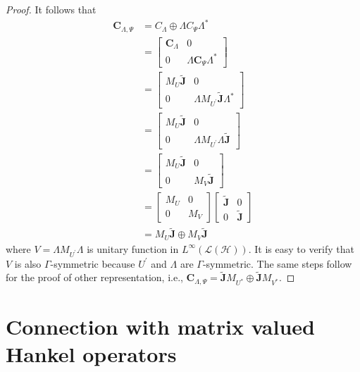 \documentclass[12pt]{amsart}
\numberwithin{equation}{section}
\newcommand{\hsp}{\mathcal{H}}
\newcommand{\oL }{\mathcal{L}(\hsp) }
\newcommand{\C}{{\mathbf{C}}}
\newcommand{\J}{{\mathbf{J}}}
\theoremstyle{definition}
\numberwithin{equation}{section}
\begin{document}
\begin{proof}
It follows that
\begin{align*}
\C_{\Lambda,\Psi}
&=C_{\Lambda}\oplus \Lambda C_{\Psi}\Lambda^{*}\\
&=\begin{bmatrix}
\C_{\Lambda}&0\\
0&\Lambda \C_{\Psi}\Lambda^{*}
\end{bmatrix}\\
&=\begin{bmatrix}
M_{U}\widetilde{\J}&0\\
0&\Lambda M_{U^{\prime}}\widetilde{\J}\Lambda^{*}
\end{bmatrix}\\
&=\begin{bmatrix}
M_{U}\widetilde{\J}&0\\
0&\Lambda M_{U^{\prime}}\Lambda\widetilde{\J}
\end{bmatrix}\\
&=\begin{bmatrix}
M_{U}\widetilde{\J}&0\\
0&M_{V}\widetilde{\J}
\end{bmatrix}\\
&=\begin{bmatrix}
M_{U}&0\\
0&M_{V}
\end{bmatrix}
\begin{bmatrix}
\widetilde{\J}&0\\
0&\widetilde{\J}
\end{bmatrix}\\
&=M_{U}\widetilde{\J}\oplus M_{V}\widetilde{\J}
\end{align*}
where $V=\Lambda M_{U^{\prime}}\Lambda$ is unitary function in $L^{\infty}(\oL)$. It is easy to verify that $V$ is also $\Gamma$-symmetric because $U^{\prime}$ and $\Lambda$ are $\Gamma$-symmetric. The same steps follow for the proof of other representation, i.e., $\C_{\Lambda,\Psi}=\widetilde{\J}M_{U^{*}}\oplus \widetilde{\J}M_{V^{*}}$.
\end{proof}








\section{\bf{Connection with matrix valued Hankel operators}}
\end{document}

